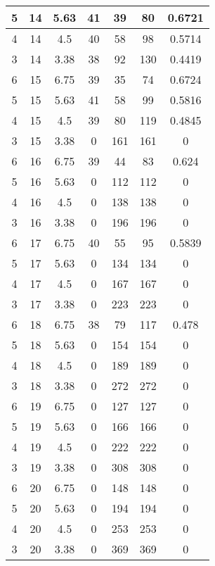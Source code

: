 \documentclass[letterpaper, 12pt]{article}
\begin{document}
\begin{longtable}{|c|c|c|c|c|c|c|}
\hline
5 & 14 & 5.63 & 41 & 39 & 80 & 0.6721 \\
\hline
4 & 14 & 4.5 & 40 & 58 & 98 & 0.5714 \\
\hline
3 & 14 & 3.38 & 38 & 92 & 130 & 0.4419 \\
\hline
6 & 15 & 6.75 & 39 & 35 & 74 & 0.6724 \\
\hline
5 & 15 & 5.63 & 41 & 58 & 99 & 0.5816 \\
\hline
4 & 15 & 4.5 & 39 & 80 & 119 & 0.4845 \\
\hline
3 & 15 & 3.38 & 0 & 161 & 161 & 0 \\
\hline
6 & 16 & 6.75 & 39 & 44 & 83 & 0.624 \\
\hline
5 & 16 & 5.63 & 0 & 112 & 112 & 0 \\
\hline
4 & 16 & 4.5 & 0 & 138 & 138 & 0 \\
\hline
3 & 16 & 3.38 & 0 & 196 & 196 & 0 \\
\hline
6 & 17 & 6.75 & 40 & 55 & 95 & 0.5839 \\
\hline
5 & 17 & 5.63 & 0 & 134 & 134 & 0 \\
\hline
4 & 17 & 4.5 & 0 & 167 & 167 & 0 \\
\hline
3 & 17 & 3.38 & 0 & 223 & 223 & 0 \\
\hline
6 & 18 & 6.75 & 38 & 79 & 117 & 0.478 \\
\hline
5 & 18 & 5.63 & 0 & 154 & 154 & 0 \\
\hline
4 & 18 & 4.5 & 0 & 189 & 189 & 0 \\
\hline
3 & 18 & 3.38 & 0 & 272 & 272 & 0 \\
\hline
6 & 19 & 6.75 & 0 & 127 & 127 & 0 \\
\hline
5 & 19 & 5.63 & 0 & 166 & 166 & 0 \\
\hline
4 & 19 & 4.5 & 0 & 222 & 222 & 0 \\
\hline
3 & 19 & 3.38 & 0 & 308 & 308 & 0 \\
\hline
6 & 20 & 6.75 & 0 & 148 & 148 & 0 \\
\hline
5 & 20 & 5.63 & 0 & 194 & 194 & 0 \\
\hline
4 & 20 & 4.5 & 0 & 253 & 253 & 0 \\
\hline
3 & 20 & 3.38 & 0 & 369 & 369 & 0 \\
\hline
\end{longtable}
\end{document}
